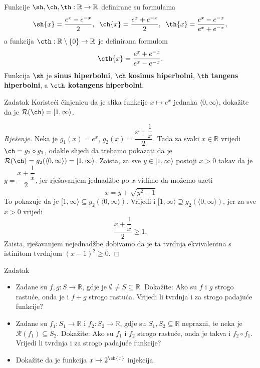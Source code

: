 \begin{definition}
Funkcije \(\sh, \ch, \th : \mathbb{R}\to \mathbb{R}\) definirane su formulama
\[\sh{x}=\dfrac{e^x-e^{-x}}{2},\;\;\ch{x}=\dfrac{e^x+e^{-x}}{2},\;\; \th{x}=\dfrac{e^x-e^{-x}}{e^x+e^{-x}},\]
a funkcija \(\cth : \mathbb{R}\setminus\{0\}\to \mathbb{R}\) je definirana formulom
\[\cth{x}=\dfrac{e^x+e^{-x}}{e^x-e^{-x}}.\]
Funkcija \(\sh\) je \textbf{sinus hiperbolni}, \(\ch\) \textbf{kosinus hiperbolni}, \(\th\) \textbf{tangens hiperbolni}, a \(\cth\) \textbf{kotangens hiperbolni}.
\end{definition}
\begin{exercise}{Zadatak}
Koristeći činjenicu da je slika funkcije \(x\mapsto e^x\) jednaka \(\langle 0, \infty\rangle\), dokažite da je \(\mathcal{R}(\ch)=[1,\infty\rangle\).
\end{exercise}
\begin{proof}[Rješenje]
Neka je \(g_1(x)=e^x\), \(g_2(x)=\dfrac{x+\dfrac{1}{x}}{2}\). Tada za svaki \(x\in \mathbb{R}\) vrijedi \(\ch=g_2\circ g_1\), odakle slijedi da trebamo pokazati da je \(\mathcal{R}(\ch)=g_2(\langle 0, \infty\rangle)=[1, \infty\rangle\).
Zaista, za sve \(y\in [1, \infty\rangle\) postoji \(x>0\) takav da je \(y=\dfrac{x+\dfrac{1}{x}}{2}\), jer rješavanjem jednadžbe po \(x\) vidimo da možemo uzeti
\[x=y+\sqrt{y^2-1}\]
To pokazuje da je \([1, \infty\rangle \subseteq g_2(\langle 0, \infty\rangle)\). Vrijedi i \([1, \infty\rangle \supseteq g_2(\langle 0, \infty\rangle)\), jer za sve \(x>0\) vrijedi \[\dfrac{x+\dfrac{1}{x}}{2}\geq 1.\] Zaista, rješavanjem nejednadžbe dobivamo da je ta tvrdnja ekvivalentna s istinitom tvrdnjom \((x-1)^2\geq 0\).
\end{proof}
\begin{exercise}{Zadatak} \textbf{}
\begin{itemize}
\item[a)] Zadane su \(f, g : S\to \mathbb{R}\), gdje je \(\emptyset\neq S\subseteq \mathbb{R}\). Dokažite: Ako su \(f\) i \(g\) strogo rastuće, onda je i \(f+g\) strogo rastuća. Vrijedi li tvrdnja i za strogo padajuće funkcije? 
\item[b)] Zadane su \(f_1 : S_1\to \mathbb{R}\) i \(f_2 : S_2\to \mathbb{R}\), gdje su \(S_1, S_2\subseteq \mathbb{R}\) neprazni, te neka je \(\mathcal{R}(f_1)\subseteq S_2\). Dokažite: Ako su \(f_1\) i \(f_2\) strogo rastuće, onda je takva i \(f_2\circ f_1\). Vrijedi li tvrdnja i za strogo padajuće funkcije?
\item[c)] Dokažite da je funkcija \(x\mapsto 2^{\sh{x}}\) injekcija.
\end{itemize}
\end{exercise}
